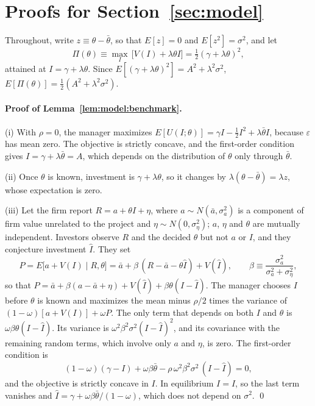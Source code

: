 
\section{Proofs for Section~\ref{sec:model}}\label{app:model}

Throughout, write $z\equiv\theta-\bar\theta$, so that $E[z]=0$ and $E[z^{2}]=\sigma^{2}$, and let
\[
  \Pi(\theta)\equiv\max_{I}\,\bigl[V(I)+\lambda\theta I\bigr]=\tfrac12(\gamma+\lambda\theta)^{2},
\]
attained at $I=\gamma+\lambda\theta$. Since $E[(\gamma+\lambda\theta)^{2}]=A^{2}+\lambda^{2}\sigma^{2}$, $E[\Pi(\theta)]=\tfrac12(A^{2}+\lambda^{2}\sigma^{2})$.

\paragraph{Proof of Lemma~\ref{lem:model:benchmark}.}
(i) With $\rho=0$, the manager maximizes $E[U(I;\theta)]=\gamma I-\tfrac12 I^{2}+\lambda\bar\theta I$, because $\varepsilon$ has mean zero. The objective is strictly concave, and the first-order condition gives $I=\gamma+\lambda\bar\theta=A$, which depends on the distribution of $\theta$ only through $\bar\theta$.

(ii) Once $\theta$ is known, investment is $\gamma+\lambda\theta$, so it changes by $\lambda(\theta-\bar\theta)=\lambda z$, whose expectation is zero.

(iii) Let the firm report $R=a+\theta I+\eta$, where $a\sim N(\bar a,\sigma_a^{2})$ is a component of firm value unrelated to the project and $\eta\sim N(0,\sigma_\eta^{2})$; $a$, $\eta$ and $\theta$ are mutually independent. Investors observe $R$ and the decided $\theta$ but not $a$ or $I$, and they conjecture investment $\hat I$. They set
\[
  P=E\bigl[a+V(I)\mid R,\theta\bigr]=\bar a+\beta\,(R-\bar a-\theta\hat I)+V(\hat I),\qquad
  \beta\equiv\frac{\sigma_a^{2}}{\sigma_a^{2}+\sigma_\eta^{2}},
\]
so that $P=\bar a+\beta(a-\bar a+\eta)+V(\hat I)+\beta\theta(I-\hat I)$. The manager chooses $I$ before $\theta$ is known and maximizes the mean minus $\rho/2$ times the variance of $(1-\omega)[a+V(I)]+\omega P$. The only term that depends on both $I$ and $\theta$ is $\omega\beta\theta(I-\hat I)$. Its variance is $\omega^{2}\beta^{2}\sigma^{2}(I-\hat I)^{2}$, and its covariance with the remaining random terms, which involve only $a$ and $\eta$, is zero. The first-order condition is
\[
  (1-\omega)(\gamma-I)+\omega\beta\bar\theta-\rho\,\omega^{2}\beta^{2}\sigma^{2}\,(I-\hat I)=0,
\]
and the objective is strictly concave in $I$. In equilibrium $I=\hat I$, so the last term vanishes and $\hat I=\gamma+\omega\beta\bar\theta/(1-\omega)$, which does not depend on $\sigma^{2}$. \qed


